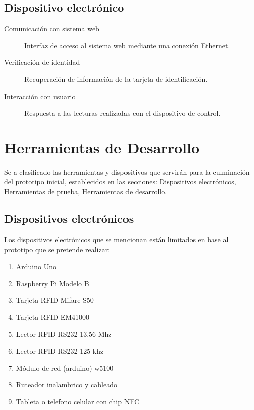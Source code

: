 \documentclass[11pt,twocolumn]{article}
\begin{document}
	\subsection{Dispositivo electr\'onico}
	
	 \begin{description}
		 \item[Comunicaci\'on con sistema web] Interfaz de acceso al sistema web 
		 mediante una conexi\'on Ethernet.
		 \item[Verificaci\'on de identidad] Recuperaci\'on de informaci\'on de la tarjeta de identificaci\'on.
		 \item[Interacci\'on con usuario] Respuesta a las lecturas realizadas con el dispositivo de control.
	 \end{description}			

\section{Herramientas de Desarrollo}

Se a clasificado las herramientas y dispositivos que servir\'an para la 
culminaci\'on del prototipo inicial, establecidos en las secciones: Dispositivos 
electr\'onicos, Herramientas de prueba, Herramientas de desarrollo.

	\subsection{Dispositivos electr\'onicos }

	Los  dispositivos electr\'onicos que se mencionan est\'an limitados en base 
	al prototipo que se pretende realizar:\\
	
	\begin{enumerate}
		\item Arduino Uno
		\item Raspberry Pi Modelo B
		\item Tarjeta RFID Mifare S50
		\item Tarjeta RFID EM41000 
		\item Lector RFID RS232 13.56 Mhz
		\item Lector RFID RS232 125 khz
		\item M\'odulo de red (arduino) w5100
		\item Ruteador inalambrico y cableado
		\item Tableta o telefono celular con chip NFC
	\end{enumerate}
	
\end{document}
